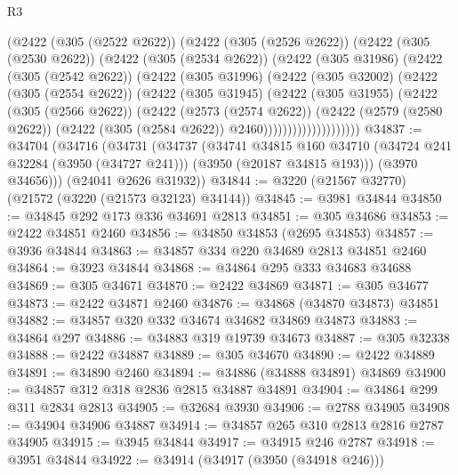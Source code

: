 \begin{lexlean}{R3}
\begin{coremodule}
              (@2422
                (@305 (@2522 @2622))
                (@2422
                  (@305 (@2526 @2622))
                  (@2422
                    (@305 (@2530 @2622))
                    (@2422
                      (@305 (@2534 @2622))
                      (@2422
                        (@305 @31986)
                        (@2422
                          (@305 (@2542 @2622))
                          (@2422
                            (@305 @31996)
                            (@2422
                              (@305 @32002)
                              (@2422
                                (@305 (@2554 @2622))
                                (@2422
                                  (@305 @31945)
                                  (@2422
                                    (@305 @31955)
                                    (@2422
                                      (@305 (@2566 @2622))
                                      (@2422
                                        (@2573 (@2574 @2622))
                                        (@2422
                                          (@2579 (@2580 @2622))
                                          (@2422 (@305 (@2584 @2622)) @2460))))))))))))))))))))
@34837 := @34704
    (@34716
      (@34731
        (@34737
          (@34741
            @34815
            @160
            @34710
            (@34724 @241 @32284 (@3950 (@34727 @241)))
            (@3950 (@20187 @34815 @193)))
          (@3970 @34656)))
      (@24041 @2626 @31932))
@34844 := @3220 (@21567 @32770) (@21572 (@3220 (@21573 @32123) @34144))
@34845 := @3981 @34844
@34850 := @34845 @292 @173 @336 @34691 @2813
@34851 := @305 @34686
@34853 := @2422 @34851 @2460
@34856 := @34850 @34853 (@2695 @34853)
@34857 := @3936 @34844
@34863 := @34857 @334 @220 @34689 @2813 @34851 @2460
@34864 := @3923 @34844
@34868 := @34864 @295 @333 @34683 @34688
@34869 := @305 @34671
@34870 := @2422 @34869
@34871 := @305 @34677
@34873 := @2422 @34871 @2460
@34876 := @34868 (@34870 @34873) @34851
@34882 := @34857 @320 @332 @34674 @34682 @34869 @34873
@34883 := @34864 @297
@34886 := @34883 @319 @19739 @34673
@34887 := @305 @32338
@34888 := @2422 @34887
@34889 := @305 @34670
@34890 := @2422 @34889
@34891 := @34890 @2460
@34894 := @34886 (@34888 @34891) @34869
@34900 := @34857 @312 @318 @2836 @2815 @34887 @34891
@34904 := @34864 @299 @311 @2834 @2813
@34905 := @32684 @3930
@34906 := @2788 @34905
@34908 := @34904 @34906 @34887
@34914 := @34857 @265 @310 @2813 @2816 @2787 @34905
@34915 := @3945 @34844
@34917 := @34915 @246 @2787
@34918 := @3951 @34844
@34922 := @34914 (@34917 (@3950 (@34918 @246)))

\end{coremodule}
\end{lexlean}
